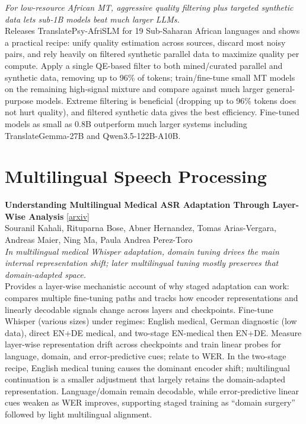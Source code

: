 \documentclass[12pt,letterpaper]{article}
\begin{document}
{\small\textit{For low-resource African MT, aggressive quality filtering plus targeted synthetic data lets sub‑1B models beat much larger LLMs.}}\\[1pt]
{\footnotesize Releases TranslatePsy-AfriSLM for 19 Sub-Saharan African languages and shows a practical recipe: unify quality estimation across sources, discard most noisy pairs, and rely heavily on filtered synthetic parallel data to maximize quality per compute. Apply a single QE-based filter to both mined/curated parallel and synthetic data, removing up to 96\% of tokens; train/fine-tune small MT models on the remaining high-signal mixture and compare against much larger general-purpose models. Extreme filtering is beneficial (dropping up to 96\% tokens does not hurt quality), and filtered synthetic data gives the best efficiency. Fine-tuned models as small as 0.8B outperform much larger systems including TranslateGemma-27B and Qwen3.5-122B-A10B.}

\medskip


\section*{Multilingual Speech Processing}

{\small\textbf{Understanding Multilingual Medical ASR Adaptation Through Layer-Wise Analysis}} {\scriptsize[\href{https://arxiv.org/abs/2608.18825}{arxiv}]}\\
{\scriptsize Souranil Kahali, Rituparna Bose, Abner Hernandez, Tomas Arias-Vergara, Andreas Maier, Ning Ma, Paula Andrea Perez-Toro}\\

{\small\textit{In multilingual medical Whisper adaptation, domain tuning drives the main internal representation shift; later multilingual tuning mostly preserves that domain-adapted space.}}\\[1pt]
{\footnotesize Provides a layer-wise mechanistic account of why staged adaptation can work: compares multiple fine-tuning paths and tracks how encoder representations and linearly decodable signals change across layers and checkpoints. Fine-tune Whisper (various sizes) under regimes: English medical, German diagnostic (low data), direct EN+DE medical, and two-stage EN-medical then EN+DE. Measure layer-wise representation drift across checkpoints and train linear probes for language, domain, and error-predictive cues; relate to WER. In the two-stage recipe, English medical tuning causes the dominant encoder shift; multilingual continuation is a smaller adjustment that largely retains the domain-adapted representation. Language/domain remain decodable, while error-predictive linear cues weaken as WER improves, supporting staged training as ``domain surgery'' followed by light multilingual alignment.}
\end{document}
